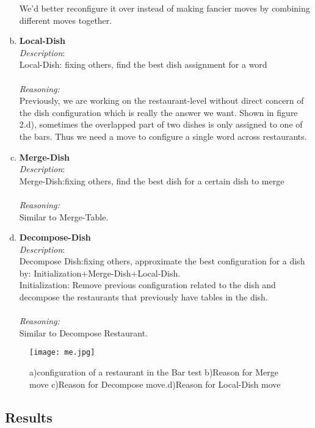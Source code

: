 \documentclass{article}
\begin{document}
\begin{enumerate}[(a)]
We'd better reconfigure it over instead of making fancier moves by combining different moves together.
\item {\bf Local-Dish}\\
\emph{Description}:\\
Local-Dish: fixing others, find the best dish assignment for a word\\\\
\emph{Reasoning:}\\Previously, we are working on the restaurant-level without direct concern of the dish configuration which is really the answer we want.
Shown in figure 2.d), sometimes the overlapped part of two dishes is only assigned to one of the bars. Thus we need a move to configure a single word across restaurants.
\item {\bf Merge-Dish}\\
\emph{Description}:\\
Merge-Dish:fixing others, find the best dish for a certain dish to merge\\ \\
\emph{Reasoning:}\\Similar to Merge-Table.
\item {\bf Decompose-Dish}\\
\emph{Description}:\\
Decompose Dish:fixing others, approximate the best configuration for a dish by: Initialization+Merge-Dish+Local-Dish.\\ 
Initialization: Remove previous configuration related to the dish and decompose the restaurants that previously have tables in the dish.\\\\
\emph{Reasoning:}\\Similar to Decompose Restaurant.
\end{enumerate}
\begin{figure}[h] 
  \texttt{[image: me.jpg]} 
  \caption{a)configuration of a restaurant in the Bar test b)Reason for Merge move c)Reason for Decompose move.d)Reason for Local-Dish move} 
  \label{fig:by:table} 
\end{figure}


\subsection{Results}
\end{document}
